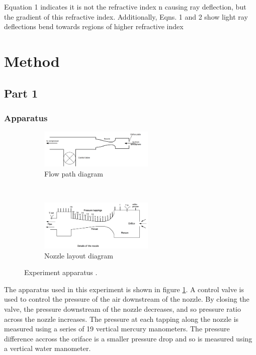\documentclass{article}
\begin{document}
Equation 1 indicates it is not the refractive index n causing ray deflection, but the gradient of
this refractive index. Additionally, Eqns. 1 and 2 show light ray deflections bend towards regions of higher
refractive index


\section{Method}
\subsection{Part 1}
\subsubsection{Apparatus}

\begin{figure}[H]
    \centering
    \begin{subfigure}{0.8\textwidth}
        \centering
        \includegraphics[width=0.6\textwidth]{flow_layout.png}
        \caption{Flow path diagram}
        \label{fig:flow_layout}
    \end{subfigure}
    ~
    \begin{subfigure}{0.8\textwidth}
        \centering
        \includegraphics[width=0.6\textwidth]{../Supersonic_Nozzle/small_nozzle_layout.png}
        \caption{Nozzle layout diagram}
        \label{fig:nozzle_layout}
    \end{subfigure}
    \caption{Experiment apparatus \cite{lab_manual}.}
\end{figure}

The apparatus used in this experiment is shown in figure \ref{fig:flow_layout}.
A control valve is used to control the pressure of the air downstream of the nozzle. By closing the valve, the pressure downstream of the nozzle decreases, and so pressure ratio across the nozzle increases.
The pressure at each tapping along the nozzle is measured using a series of 19 vertical mercury manometers.
The pressure difference accross the oriface is a smaller pressure drop and so is measured using a vertical water manometer.
\end{document}
